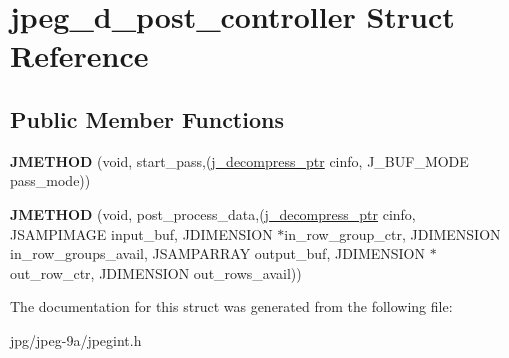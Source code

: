 \hypertarget{structjpeg__d__post__controller}{\section{jpeg\+\_\+d\+\_\+post\+\_\+controller Struct Reference}
\label{structjpeg__d__post__controller}
}
\subsection*{Public Member Functions}
\begin{DoxyCompactItemize}
\item 
\hypertarget{structjpeg__d__post__controller_a349b2ff7508568d13a9294f3e79163aa}{{\bfseries J\+M\+E\+T\+H\+O\+D} (void, start\+\_\+pass,(\hyperlink{structjpeg__decompress__struct}{j\+\_\+decompress\+\_\+ptr} cinfo, J\+\_\+\+B\+U\+F\+\_\+\+M\+O\+D\+E pass\+\_\+mode))}\label{structjpeg__d__post__controller_a349b2ff7508568d13a9294f3e79163aa}

\item 
\hypertarget{structjpeg__d__post__controller_adb337adcfe3a314ceac4b626a73d87c3}{{\bfseries J\+M\+E\+T\+H\+O\+D} (void, post\+\_\+process\+\_\+data,(\hyperlink{structjpeg__decompress__struct}{j\+\_\+decompress\+\_\+ptr} cinfo, J\+S\+A\+M\+P\+I\+M\+A\+G\+E input\+\_\+buf, J\+D\+I\+M\+E\+N\+S\+I\+O\+N $\ast$in\+\_\+row\+\_\+group\+\_\+ctr, J\+D\+I\+M\+E\+N\+S\+I\+O\+N in\+\_\+row\+\_\+groups\+\_\+avail, J\+S\+A\+M\+P\+A\+R\+R\+A\+Y output\+\_\+buf, J\+D\+I\+M\+E\+N\+S\+I\+O\+N $\ast$out\+\_\+row\+\_\+ctr, J\+D\+I\+M\+E\+N\+S\+I\+O\+N out\+\_\+rows\+\_\+avail))}\label{structjpeg__d__post__controller_adb337adcfe3a314ceac4b626a73d87c3}

\end{DoxyCompactItemize}


The documentation for this struct was generated from the following file\+:\begin{DoxyCompactItemize}
\item 
jpg/jpeg-\/9a/jpegint.\+h\end{DoxyCompactItemize}
